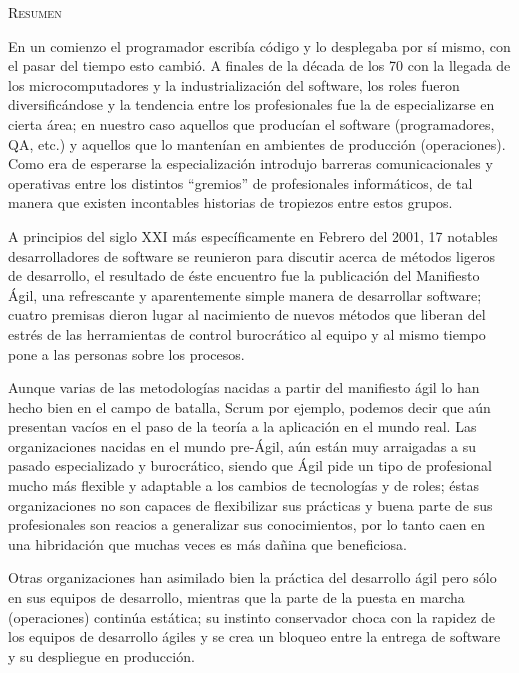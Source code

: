 \documentclass[conference]{IEEEtran}
\begin{document}

\noindent
\begin{minipage}{0.9\textwidth}
 \textsc{Resumen}
\end{minipage}

En un comienzo el programador escribía código y lo desplegaba por sí mismo, con el pasar del tiempo esto cambió. A finales de la década de los 70 con la llegada de los microcomputadores y la industrialización del software, los roles fueron diversificándose y la tendencia entre los profesionales fue la de especializarse en cierta área; en nuestro caso aquellos que producían el software (programadores, QA, etc.) y aquellos que lo mantenían en ambientes de producción (operaciones). Como era de esperarse la especialización introdujo barreras comunicacionales y operativas entre los distintos “gremios” de profesionales informáticos, de tal manera que existen incontables historias de tropiezos entre estos grupos. 

A principios del siglo XXI más específicamente en Febrero del 2001, 17 notables desarrolladores de software se reunieron para discutir acerca de métodos ligeros de desarrollo, el resultado de éste encuentro fue la publicación del Manifiesto Ágil, una refrescante y aparentemente simple manera de desarrollar software; cuatro premisas dieron lugar al nacimiento de nuevos métodos que liberan del estrés de las herramientas de control burocrático al equipo y al mismo tiempo pone a las personas sobre los procesos. 

Aunque varias de las metodologías nacidas a partir del manifiesto ágil lo han hecho bien en el campo de batalla, Scrum por ejemplo, podemos decir que aún presentan vacíos en el paso de la teoría a la aplicación en el mundo real. Las organizaciones nacidas en el mundo pre-Ágil, aún están muy arraigadas a su pasado especializado y burocrático, siendo que Ágil pide un tipo de profesional mucho más flexible y adaptable a los cambios de tecnologías y de roles; éstas organizaciones no son capaces de flexibilizar sus prácticas y buena parte de sus profesionales son reacios a generalizar sus conocimientos, por lo tanto caen en una hibridación que muchas veces es más dañina que beneficiosa. 

Otras organizaciones han asimilado bien la práctica del desarrollo ágil pero sólo en sus equipos de desarrollo, mientras que la parte de la puesta en marcha (operaciones) continúa estática; su instinto conservador choca con la rapidez de los equipos de desarrollo ágiles y se crea un bloqueo entre la entrega de software y su despliegue en producción.
\end{document}

